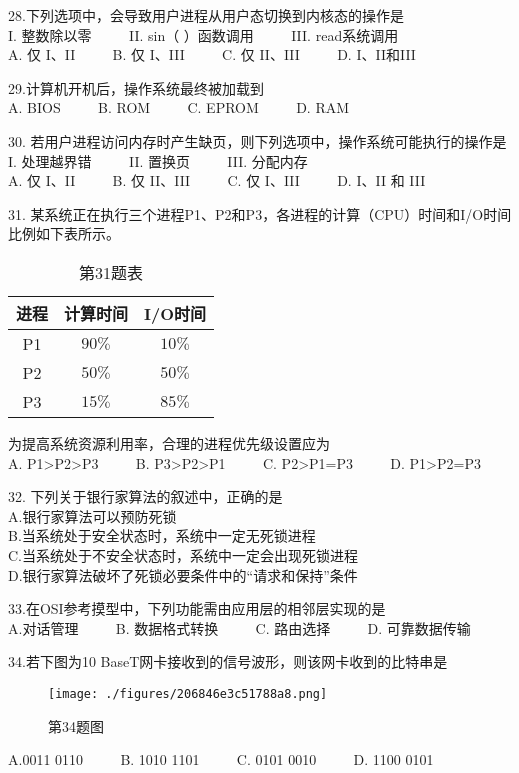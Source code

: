 28.下列选项中，会导致用户进程从用户态切换到内核态的操作是 \\
I. 整数除以零  $\qquad$  II. sin（ ）函数调用  $\qquad$   III. read系统调用 \\
A. 仅 I、II $\qquad$ B. 仅 I、III $\qquad$ C. 仅 II、III $\qquad$ D. I、II和III

29.计算机开机后，操作系统最终被加载到 \\
    A. BIOS $\qquad$ B. ROM $\qquad$ C. EPROM $\qquad$ D. RAM 

30. 若用户进程访问内存时产生缺页，则下列选项中，操作系统可能执行的操作是 \\
    I. 处理越界错 $\qquad$ II. 置换页 $\qquad$ III. 分配内存 \\
    A. 仅 I、II $\qquad$ B. 仅 II、III $\qquad$ C. 仅 I、III $\qquad$ D. I、II 和 III 

31. 某系统正在执行三个进程P1、P2和P3，各进程的计算（CPU）时间和I/O时间比例如下表所示。 \\
\begin{table}[ht]
\centering
\caption{第31题表}\label{tab_CSN13_3}
\begin{tabular}{|c|c|c|}
\hline
进程 & 计算时间 & I/O时间 \\
\hline
P1 & $90\%$ & $10\%$ \\
\hline
P2 & $50\%$ & $50\%$ \\
\hline
P3 & $15\%$ & $85\%$ \\
\hline
\end{tabular}
\end{table}
为提高系统资源利用率，合理的进程优先级设置应为 \\
A. P1>P2>P3 $\qquad$ B. P3>P2>P1 $\qquad$ C. P2>P1=P3 $\qquad$ D. P1>P2=P3

32. 下列关于银行家算法的叙述中，正确的是 \\
A.银行家算法可以预防死锁 \\
B.当系统处于安全状态时，系统中一定无死锁进程 \\
C.当系统处于不安全状态时，系统中一定会出现死锁进程 \\
D.银行家算法破坏了死锁必要条件中的“请求和保持”条件

33.在OSI参考摸型中，下列功能需由应用层的相邻层实现的是 \\
A.对话管理 $\qquad$ B. 数据格式转换 $\qquad$ C. 路由选择 $\qquad$ D. 可靠数据传输

34.若下图为10 BaseT网卡接收到的信号波形，则该网卡收到的比特串是 \\
\begin{figure}[ht]
\centering
\texttt{[image: ./figures/206846e3c51788a8.png]}
\caption{第34题图} \label{fig_CSN13_4}
\end{figure}
A.0011 0110 $\qquad$ B. 1010 1101 $\qquad$ C. 0101 0010 $\qquad$ D. 1100 0101

